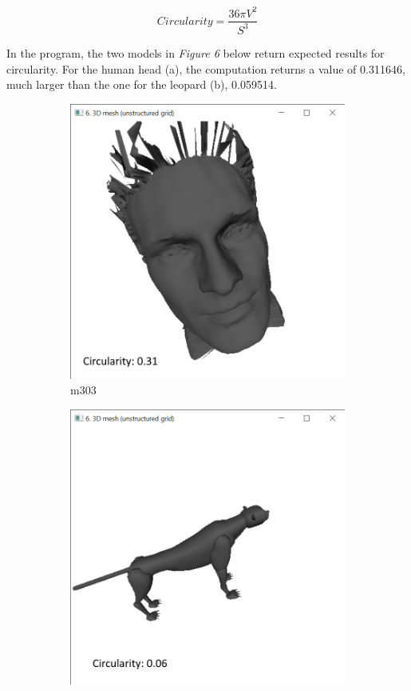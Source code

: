 \documentclass{bigdata}
\begin{document}
\begin{equation}
Circularity = \frac{36\pi V^2}{S^3}
\end{equation}

\noindent In the program, the two models in \textit{Figure 6} below return expected results for circularity. For the human head (a), the computation returns a value of 0.311646, much larger than the one for the leopard (b), 0.059514.

\begin{figure}[h!]
	\centering
	\begin{subfigure}[b]{0.35\linewidth}
		\includegraphics[width=\linewidth]{Pictures/Part3/circHead.png}
		\caption{m303}
	\end{subfigure}
	\begin{subfigure}[b]{0.35\linewidth}
		\includegraphics[width=\linewidth]{Pictures/Part3/circLeo.png}

\end{subfigure}
\end{figure}
\end{document}
